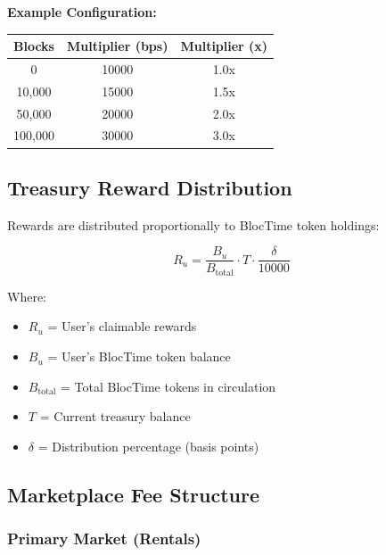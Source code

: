 \documentclass[12pt,a4paper]{article}
\begin{document}
\textbf{Example Configuration:}

\begin{center}
\begin{tabular}{|c|c|c|}
\hline
\textbf{Blocks} & \textbf{Multiplier (bps)} & \textbf{Multiplier (x)} \\
\hline
0 & 10000 & 1.0x \\
10,000 & 15000 & 1.5x \\
50,000 & 20000 & 2.0x \\
100,000 & 30000 & 3.0x \\
\hline
\end{tabular}
\end{center}

\subsection{Treasury Reward Distribution}

Rewards are distributed proportionally to BlocTime token holdings:

\begin{tcolorbox}[colback=treasurygreen!5,colframe=treasurygreen,title=Reward Distribution Equation]
\begin{equation}
\boxed{R_u = \frac{B_u}{B_{\text{total}}} \cdot T \cdot \frac{\delta}{10000}}
\end{equation}

Where:
\begin{itemize}
    \item $R_u$ = User's claimable rewards
    \item $B_u$ = User's BlocTime token balance
    \item $B_{\text{total}}$ = Total BlocTime tokens in circulation
    \item $T$ = Current treasury balance
    \item $\delta$ = Distribution percentage (basis points)
\end{itemize}
\end{tcolorbox}

\subsection{Marketplace Fee Structure}

\subsubsection{Primary Market (Rentals)}
\end{document}
